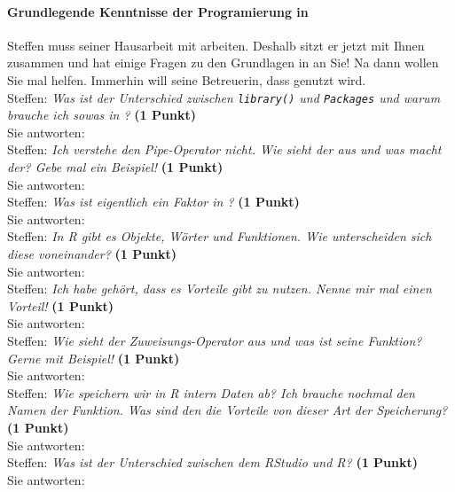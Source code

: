 \documentclass[a4paper, 9pt]{scrartcl}\usepackage[]{graphicx}\usepackage[]{xcolor}
\begin{document}
\paragraph{Grundlegende Kenntnisse der Programierung in \Rlogo}

Steffen muss seiner Hausarbeit mit \Rlogo arbeiten. Deshalb sitzt er jetzt mit Ihnen zusammen und hat einige Fragen zu den Grundlagen in \Rlogo an Sie! Na dann wollen Sie mal helfen. Immerhin will seine Betreuerin, dass \Rlogo genutzt wird.\\[1Ex]

Steffen: \textit{Was ist der Unterschied zwischen \texttt{library()} und \texttt{Packages} und warum brauche ich sowas in \Rlogo?} \textbf{(1 Punkt)}\\[1ex]
Sie antworten:\\[2Ex]

Steffen: \textit{Ich verstehe den Pipe-Operator nicht. Wie sieht der aus und was macht der? Gebe mal ein Beispiel!} \textbf{(1 Punkt)}\\[1ex]
Sie antworten:\\[2Ex]

Steffen: \textit{Was ist eigentlich ein Faktor in \Rlogo?} \textbf{(1 Punkt)}\\[1ex]
Sie antworten:\\[2Ex]

Steffen: \textit{In R gibt es Objekte, Wörter und Funktionen. Wie unterscheiden sich diese voneinander?} \textbf{(1 Punkt)}\\[1ex]
Sie antworten:\\[2Ex]

Steffen: \textit{Ich habe gehört, dass es Vorteile gibt \Rlogo zu nutzen. Nenne mir mal einen Vorteil!} \textbf{(1 Punkt)}\\[1ex]
Sie antworten:\\[2Ex]

Steffen: \textit{Wie sieht der Zuweisungs-Operator aus und was ist seine Funktion? Gerne mit Beispiel!} \textbf{(1 Punkt)}\\[1ex]
Sie antworten:\\[2Ex]

Steffen: \textit{Wie speichern wir in R intern Daten ab? Ich brauche nochmal den Namen der Funktion. Was sind den die Vorteile von dieser Art der Speicherung?} \textbf{(1 Punkt)}\\[1ex]
Sie antworten:\\[2Ex]

Steffen: \textit{Was ist der Unterschied zwischen dem RStudio und R?} \textbf{(1 Punkt)}\\[1ex]
Sie antworten:\\[2Ex]
\end{document}

